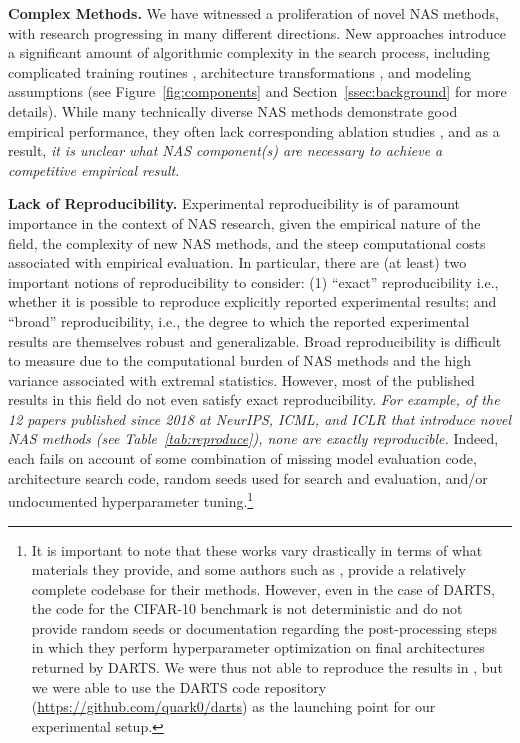 \documentclass[acmlarge, nonacm]{acmart}
\begin{document}
    \textbf{Complex Methods.} 
    We have witnessed a proliferation of novel NAS methods, with research
    progressing in many different directions.  New approaches  introduce a significant amount of
    algorithmic complexity in the search process, including complicated training routines \citep{bender2018understanding, pham18ENAS,xie2018snas,cai2018proxylessnas}, architecture transformations \citep{wei2016morphism,Real2018,cai2018path, liu2018hierarchical, Elsken2018pareto}, and modeling assumptions \citep{Jin2018, Kandasamy2018, zhang2018graph, brock2018smash, pnas2018}  (see Figure~\ref{fig:components} and Section~\ref{ssec:background} for more details).
    While many technically diverse NAS methods demonstrate good empirical performance, they often lack corresponding ablation studies \citep{Luo2018,zhang2018graph,cai2018proxylessnas}, and as a result,  
    \emph{it is unclear what NAS component(s)
    are necessary to achieve a competitive empirical result}. 
    
   \textbf{Lack of Reproducibility.} 
   Experimental reproducibility is of paramount importance in the context of NAS research, given the empirical nature of the field, the complexity of new NAS methods, and the steep computational costs associated with empirical evaluation.  In particular, there are (at least) two important notions of reproducibility to consider: (1) ``exact'' reproducibility i.e., whether it is possible to reproduce explicitly reported experimental results; and ``broad'' reproducibility, i.e., the degree to which the reported experimental results are themselves robust and generalizable.  Broad reproducibility is difficult to measure due to the 
   computational burden of NAS methods and the high variance associated with extremal statistics.  However, most of the published results in this field do not even satisfy exact reproducibility.  \emph{For example, of the 12 papers published since 2018 at NeurIPS, ICML, and ICLR that introduce novel NAS methods (see Table~\ref{tab:reproduce}), none are exactly reproducible.} Indeed, each fails on account of some combination of missing model evaluation code, architecture search code, random seeds used for search and evaluation, and/or undocumented hyperparameter tuning.\footnote{It is important to note that these works vary drastically in terms of what materials they provide, and some authors such as 
   \citet{liu2018darts},  provide a relatively complete codebase for their methods.  However, even in the case of DARTS, the code for the CIFAR-10 benchmark is not deterministic and \citet{liu2018darts} do not provide random seeds or documentation regarding the post-processing steps in which they perform hyperparameter optimization on final architectures returned by DARTS. We were thus not able to reproduce the results in \citet{liu2018darts}, but we were able to use the DARTS code repository (\url{https://github.com/quark0/darts}) as the launching point for our experimental setup. }
 
\end{document}
